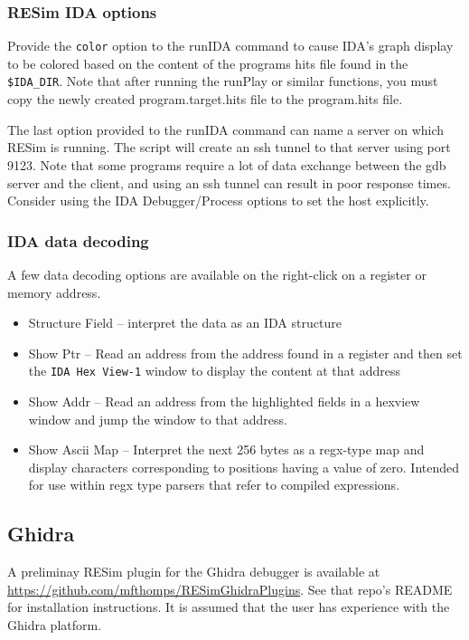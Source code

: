 \documentclass[titlepage]{article}
\begin{document}
\subsubsection{RESim IDA options}
Provide the {\tt color} option to the runIDA command to cause IDA's graph display to be colored based on the content of the
programs hits file found in the {\tt \$IDA\_DIR}.  Note that after running the runPlay or similar functions, you must copy the
newly created program.target.hits file to the program.hits file.

The last option provided to the runIDA command can name a server on which RESim is running. The script will create an ssh tunnel to that
server using port 9123.  Note that some programs require a lot of data exchange between the gdb server and the client, and using an ssh 
tunnel can result in poor response times.  Consider using the IDA Debugger/Process options to set the host explicitly.

\subsubsection{IDA data decoding}
A few data decoding options are available on the right-click on a register or memory address.
\begin{itemize}
\item Structure Field -- interpret the data as an IDA structure
\item Show Ptr -- Read an address from the address found in a register and then set the {\tt IDA Hex View-1} window to display the content at that address
\item Show Addr -- Read an address from the highlighted fields in a hexview window and jump the window to that address.
\item Show Ascii Map -- Interpret the next 256 bytes as a regx-type map and display characters corresponding to positions having a value of zero.  Intended
for use within regx type parsers that refer to compiled expressions.
\end{itemize}

\subsection{Ghidra}
\label{ghidra}
A preliminay RESim plugin for the Ghidra debugger is available at \url{https://github.com/mfthomps/RESimGhidraPlugins}.
See that repo's README for installation instructions.  It is assumed that the user has experience with the Ghidra platform.
\end{document}
